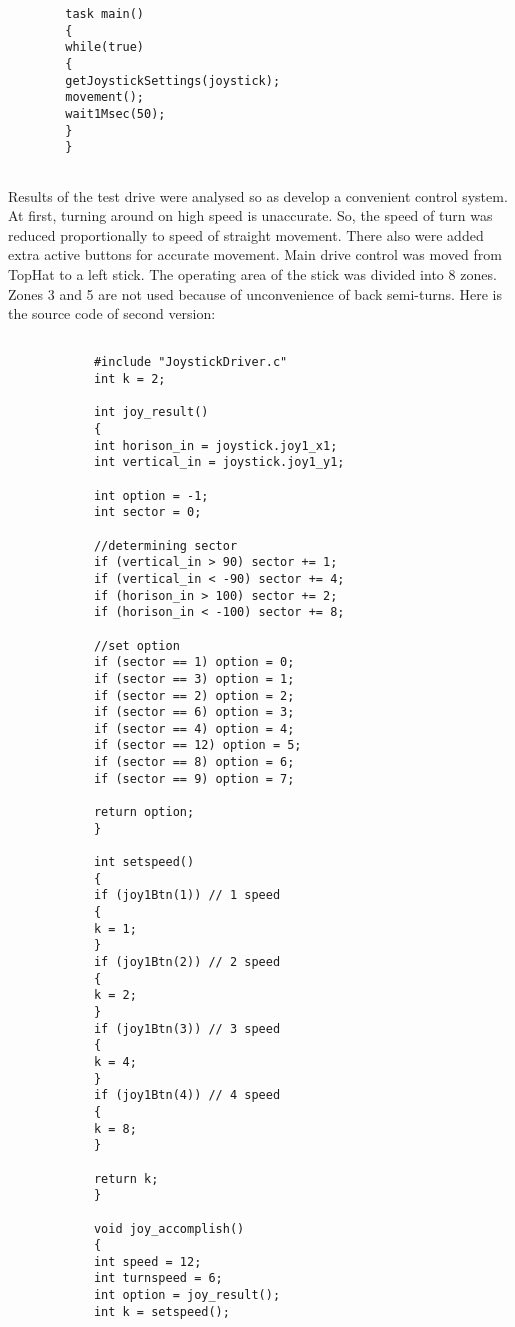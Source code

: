 \begin{enumerate*}
{\begin{verbatim}
	    task main()
	    {
	    while(true)
	    {
	    getJoystickSettings(joystick);
	    movement();
	    wait1Msec(50);
	    }
	    }
	    
	    \end{verbatim} 
	    }
	    \item Results of the test drive were analysed so as develop a convenient control system. At first, turning around on high speed is unaccurate. So, the speed of turn was reduced proportionally to speed of straight movement. There also were added extra active buttons for accurate movement. Main drive control was moved from TopHat to a left stick. The operating area of the stick was divided into 8 zones. Zones 3 and 5 %
	    are not used because of unconvenience of back semi-turns. \newline
	    Here is the source code of second version: \newline
	    {\small
	    	\begin{verbatim}
	    	
	    	#include "JoystickDriver.c"
	    	int k = 2;
	    	
	    	int joy_result()
	    	{
	    	int horison_in = joystick.joy1_x1;
	    	int vertical_in = joystick.joy1_y1;
	    	
	    	int option = -1;
	    	int sector = 0;
	    	
	    	//determining sector
	    	if (vertical_in > 90) sector += 1;
	    	if (vertical_in < -90) sector += 4;
	    	if (horison_in > 100) sector += 2;
	    	if (horison_in < -100) sector += 8;
	    	
	    	//set option  
	    	if (sector == 1) option = 0;
	    	if (sector == 3) option = 1;
	    	if (sector == 2) option = 2;
	    	if (sector == 6) option = 3;
	    	if (sector == 4) option = 4;
	    	if (sector == 12) option = 5;
	    	if (sector == 8) option = 6;
	    	if (sector == 9) option = 7;
	    	
	    	return option;
	    	}
	    	
	    	int setspeed()
	    	{
	    	if (joy1Btn(1))	// 1 speed
	    	{
	    	k = 1;
	    	}
	    	if (joy1Btn(2))	// 2 speed
	    	{
	    	k = 2;
	    	}
	    	if (joy1Btn(3))	// 3 speed
	    	{
	    	k = 4;
	    	}
	    	if (joy1Btn(4))	// 4 speed
	    	{
	    	k = 8;
	    	}
	    	
	    	return k;
	    	}
	    	
	    	void joy_accomplish()
	    	{
	    	int speed = 12;
	    	int turnspeed = 6;
	    	int option = joy_result();
	    	int k = setspeed();
	    	

\end{verbatim}}
\end{enumerate*}
